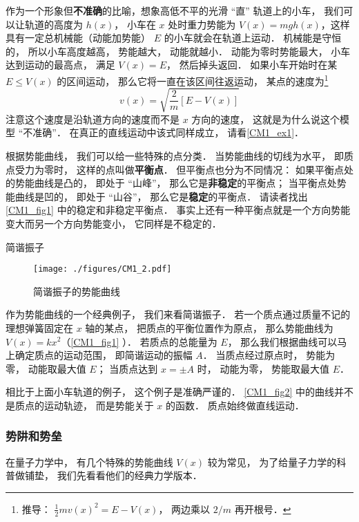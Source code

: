 作为一个形象但\textbf{不准确}的比喻，想象高低不平的光滑 “直” 轨道上的小车， 我们可以让轨道的高度为 $h(x)$， 小车在 $x$ 处时重力势能为 $V(x) = mgh(x)$，这样具有一定总机械能（动能加势能） $E$ 的小车就会在轨道上运动． 机械能是守恒的， 所以小车高度越高， 势能越大， 动能就越小． 动能为零时势能最大， 小车达到运动的最高点， 满足 $V(x) = E$， 然后掉头返回． 如果小车开始时在某 $E \leq V(x)$ 的区间运动， 那么它将一直在该区间往返运动， 某点的速度为\footnote{推导： $\frac{1}{2}mv(x)^2 = E - V(x)$， 两边乘以 $2/m$ 再开根号．}
\begin{equation}\label{CM1_eq1}
v(x) = \sqrt{\frac{2}{m}[E - V(x)]}
\end{equation}
注意这个速度是沿轨道方向的速度而不是 $x$ 方向的速度， 这就是为什么说这个模型 “不准确”． 在真正的直线运动中该式同样成立， 请看\autoref{CM1_ex1}．

根据势能曲线， 我们可以给一些特殊的点分类． 当势能曲线的切线为水平， 即质点受力为零时， 这样的点叫做\textbf{平衡点}． 但平衡点也分为不同情况： 如果平衡点处的势能曲线是凸的， 即处于 “山峰”， 那么它是\textbf{非稳定}的平衡点； 当平衡点处势能曲线是凹的， 即处于 “山谷”， 那么它是\textbf{稳定}的平衡点． 请读者找出\autoref{CM1_fig1} 中的稳定和非稳定平衡点． 事实上还有一种平衡点就是一个方向势能变大而另一个方向势能变小， 它同样是不稳定的．


\begin{example}{简谐振子}\label{CM1_ex1}
\begin{figure}[ht]
\centering
\texttt{[image: ./figures/CM1\_2.pdf]}
\caption{简谐振子的势能曲线} \label{CM1_fig2}
\end{figure}

作为势能曲线的一个经典例子， 我们来看简谐振子． 若一个质点通过质量不记的理想弹簧固定在 $x$ 轴的某点， 把质点的平衡位置作为原点， 那么势能曲线为 $V(x) = kx^2$（\autoref{CM1_fig1} ）． 若质点的总能量为 $E$， 那么我们根据曲线可以马上确定质点的运动范围， 即简谐运动的振幅 $A$． 当质点经过原点时， 势能为零， 动能取最大值 $E$； 当质点达到 $x = \pm A$ 时， 动能为零， 势能取最大值 $E$．
\end{example}
相比于上面小车轨道的例子， 这个例子是准确严谨的． \autoref{CM1_fig2} 中的曲线并不是质点的运动轨迹， 而是势能关于 $x$ 的函数． 质点始终做直线运动．

\subsubsection{势阱和势垒}
在量子力学中， 有几个特殊的势能曲线 $V(x)$ 较为常见， 为了给量子力学的科普做铺垫， 我们先看看他们的经典力学版本．

